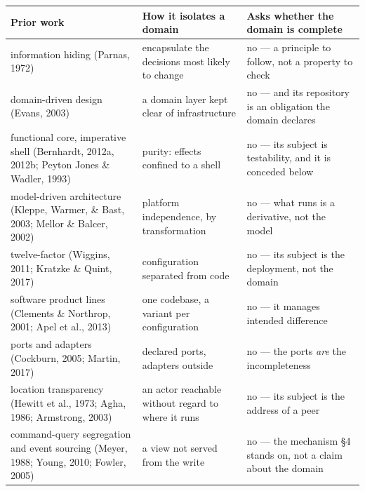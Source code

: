 \documentclass[
]{article}
\newcounter{none} %
\begin{document}
{\def\LTcaptype{none} %
\begin{longtable}[]{@{}
  >{\raggedright\arraybackslash}p{}
  >{\raggedright\arraybackslash}p{}
  >{\raggedright\arraybackslash}p{}@{}}
\toprule\noalign{}
\begin{minipage}[b]{\linewidth}\raggedright
Prior work
\end{minipage} & \begin{minipage}[b]{\linewidth}\raggedright
How it isolates a domain
\end{minipage} & \begin{minipage}[b]{\linewidth}\raggedright
Asks whether the domain is complete
\end{minipage} \\
\midrule\noalign{}
\endhead
\bottomrule\noalign{}
\endlastfoot
information hiding (Parnas, 1972) & encapsulate the decisions most
likely to change & no --- a principle to follow, not a property to
check \\
domain-driven design (Evans, 2003) & a domain layer kept clear of
infrastructure & no --- and its repository is an obligation the domain
declares \\
functional core, imperative shell (Bernhardt, 2012a, 2012b; Peyton Jones
\& Wadler, 1993) & purity: effects confined to a shell & no --- its
subject is testability, and it is conceded below \\
model-driven architecture (Kleppe, Warmer, \& Bast, 2003; Mellor \&
Balcer, 2002) & platform independence, by transformation & no --- what
runs is a derivative, not the model \\
twelve-factor (Wiggins, 2011; Kratzke \& Quint, 2017) & configuration
separated from code & no --- its subject is the deployment, not the
domain \\
software product lines (Clements \& Northrop, 2001; Apel et al., 2013) &
one codebase, a variant per configuration & no --- it manages intended
difference \\
ports and adapters (Cockburn, 2005; Martin, 2017) & declared ports,
adapters outside & no --- the ports \emph{are} the incompleteness \\
location transparency (Hewitt et al., 1973; Agha, 1986; Armstrong, 2003)
& an actor reachable without regard to where it runs & no --- its
subject is the address of a peer \\
command-query segregation and event sourcing (Meyer, 1988; Young, 2010;
Fowler, 2005) & a view not served from the write & no --- the mechanism
§4 stands on, not a claim about the domain \\
\end{longtable}
}
\end{document}
